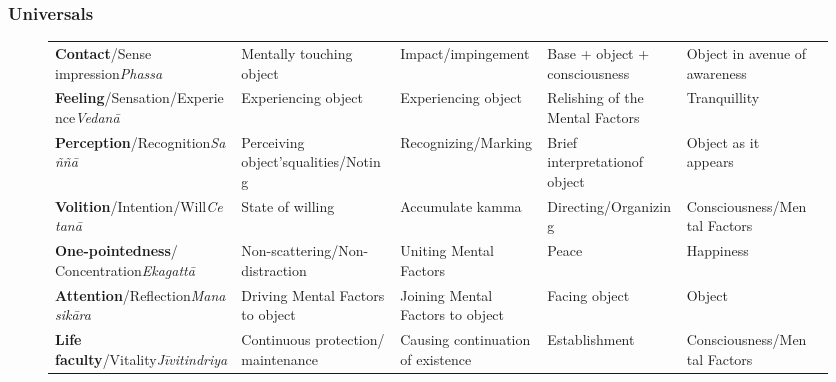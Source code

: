 \subsubsection*{Universals}

\begin{figure} [H]

\setlength{\tabcolsep}{0pt}
\renewcommand{\arraystretch}{1.1}

\noindent\begin{tabular}{P{0.25\textwidth} | C{.185\textwidth} C{0.185\textwidth} C{0.185\textwidth} C{0.195\textwidth} m{0mm}}
\toprule
 &  &  &  & \\
\midrule
\textbf{Contact}/\newline Sense impression\newline \textit{Phassa} & Mentally touching object & Impact/\newline impingement & Base + object + consciousness & Object in avenue of awareness &\\[12mm]
\textbf{Feeling}/\newline Sensation/Experience\newline \textit{Vedanā} & Experiencing object & Experiencing object & Relishing of the Mental Factors & Tranquillity &\\[12mm]
\textbf{Perception}/\newline Recognition\newline \textit{Saññā} & Perceiving object’s\newline qualities/Noting & Recognizing/\newline Marking & Brief interpretation\newline of object & Object as it appears &\\[12mm]
\textbf{Volition}/\newline Intention/Will\newline \textit{Cetanā} & State of willing & Accumulate kamma & Directing/\newline Organizing & Consciousness/\newline Mental Factors &\\[12mm]
\textbf{One-pointedness}/ Concentration\newline \textit{Ekagattā} & Non-scattering/\newline Non-distraction & Uniting Mental Factors & Peace & Happiness &\\[12mm]
\textbf{Attention}/\newline Reflection\newline \textit{Manasikāra} & Driving Mental Factors to object & Joining Mental Factors to object & Facing object & Object &\\[12mm]
\textbf{Life faculty}/\newline Vitality\newline \textit{Jīvitindriya} & Continuous protection/ maintenance & Causing continuation of existence & Establishment & Consciousness/\newline Mental Factors &\\[12mm]
\bottomrule
\end{tabular} 


\end{figure}
